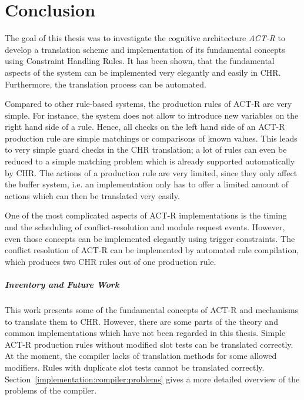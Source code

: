 \chapter{Conclusion}
\label{conclusion}

The goal of this thesis was to investigate the cognitive architecture \emph{ACT-R} to develop a translation scheme and implementation of its fundamental concepts using Constraint Handling Rules. It has been shown, that the fundamental aspects of the system can be implemented very elegantly and easily in CHR. Furthermore, the translation process can be automated. 

Compared to other rule-based systems, the production rules of ACT-R are very simple. For instance, the system does not allow to introduce new variables on the right hand side of a rule. Hence, all checks on the left hand side of an ACT-R production rule are simple matchings or comparisons of known values. This leads to very simple guard checks in the CHR translation; a lot of rules can even be reduced to a simple matching problem which is already supported automatically by CHR. The actions of a production rule are very limited, since they only affect the buffer system, i.e. an implementation only has to offer a limited amount of actions which can then be translated very easily.

One of the most complicated aspects of ACT-R implementations is the timing and the scheduling of conflict-resolution and module request events. However, even those concepts can be implemented elegantly using trigger constraints. The conflict resolution of ACT-R can be implemented by automated rule compilation, which produces two CHR rules out of one production rule.

\paragraph{Inventory and Future Work}

This work presents some of the fundamental concepts of ACT-R and mechanisms to translate them to CHR. However, there are some parts of the theory and common implementations which have not been regarded in this thesis. Simple ACT-R production rules without modified slot tests can be translated correctly. At the moment, the compiler lacks of translation methods for some allowed modifiers. Rules with duplicate slot tests cannot be translated correctly. Section~\ref{implementation:compiler:problems} gives a more detailed overview of the problems of the compiler.

